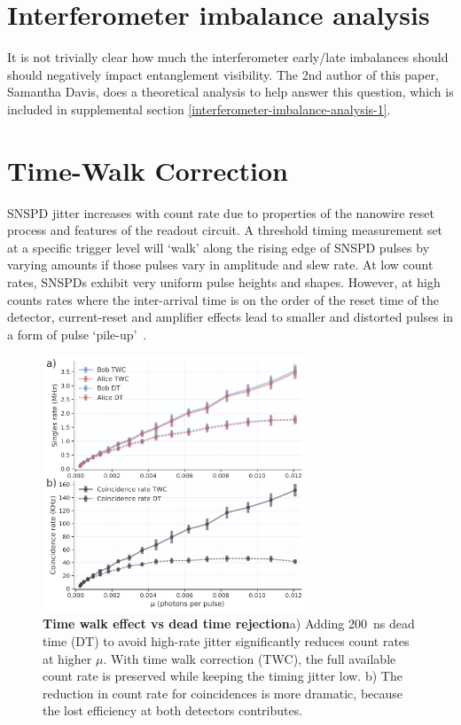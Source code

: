 \documentclass[11pt]{caltech_thesis} %
\begin{document}
\hypertarget{interferometer-imbalance-analysis}{%
\section{Interferometer imbalance analysis}\label{interferometer-imbalance-analysis}}

It is not trivially clear how much the interferometer early/late imbalances should should negatively impact entanglement visibility. The 2nd author of this paper, Samantha Davis, does a theoretical analysis to help answer this question, which is included in supplemental section \ref{interferometer-imbalance-analysis-1}.

\hypertarget{time-walk-correction}{%
\section{Time-Walk Correction}\label{time-walk-correction}}

SNSPD jitter increases with count rate due to properties of the nanowire reset process and features of the readout circuit. A threshold timing measurement set at a specific trigger level will `walk' along the rising edge of SNSPD pulses by varying amounts if those pulses vary in amplitude and slew rate. At low count rates, SNSPDs exhibit very uniform pulse heights and shapes. However, at high counts rates where the inter-arrival time is on the order of the reset time of the detector, current-reset and amplifier effects lead to smaller and distorted pulses in a form of pulse `pile-up'~\autocite{Mueller2023}.

\hypertarget{fig:time_walk_vs_dead_time}{%
\begin{figure}
\centering
\includegraphics[width=0.7\textwidth,height=\textheight]{./chapter_05/figs/time_walk_comparison_light.pdf}
\caption[{sTime walk effect vs dead time rejection}]{\textbf{Time walk effect vs dead time rejection}a) Adding 200~ns dead time (DT) to avoid high-rate jitter significantly reduces count rates at higher $\mu$. With time walk correction (TWC), the full available count rate is preserved while keeping the timing jitter low. b) The reduction in count rate for coincidences is more dramatic, because the lost efficiency at both detectors contributes.}
\label{fig:time_walk_vs_dead_time}
\end{figure}
}
\end{document}
